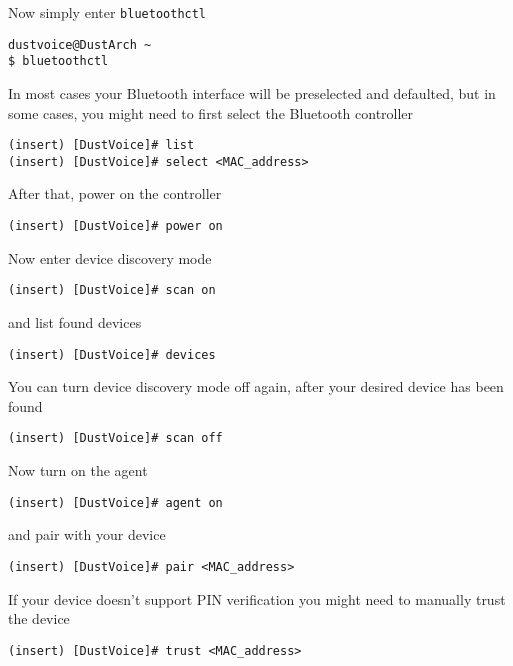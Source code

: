 \documentclass[10pt]{dustdoc}
\begin{document}
Now simply enter \texttt{bluetoothctl}

\begin{verbatim}
dustvoice@DustArch ~
$ bluetoothctl
\end{verbatim}

In most cases your Bluetooth interface will be preselected and defaulted, but in some cases, you might need to first select the Bluetooth controller

\begin{verbatim}
(insert) [DustVoice]# list
(insert) [DustVoice]# select <MAC_address>
\end{verbatim}

After that, power on the controller

\begin{verbatim}
(insert) [DustVoice]# power on
\end{verbatim}

Now enter device discovery mode

\begin{verbatim}
(insert) [DustVoice]# scan on
\end{verbatim}

\noindent
and list found devices

\begin{verbatim}
(insert) [DustVoice]# devices
\end{verbatim}

\begin{NOTE}
    You can turn device discovery mode off again, after your desired device has been found

    \begin{verbatim}
(insert) [DustVoice]# scan off
    \end{verbatim}
\end{NOTE}

Now turn on the agent

\begin{verbatim}
(insert) [DustVoice]# agent on
\end{verbatim}

\noindent
and pair with your device

\begin{verbatim}
(insert) [DustVoice]# pair <MAC_address>
\end{verbatim}

\begin{NOTE}
    If your device doesn’t support PIN verification you might need to manually trust the device

    \begin{verbatim}
(insert) [DustVoice]# trust <MAC_address>
    \end{verbatim}
\end{NOTE}
\end{document}
